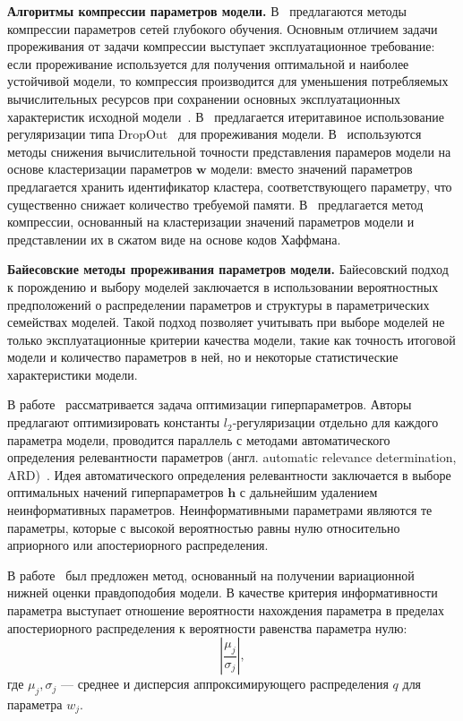 \textbf{Алгоритмы компрессии параметров модели.}
В~\cite{weight_quantization, weight_quantization2,nvidia_prune} предлагаются методы компрессии параметров сетей глубокого обучения. Основным отличием задачи прореживания от задачи компрессии выступает эксплуатационное требование: если прореживание используется для получения оптимальной и наиболее устойчивой модели, то компрессия производится для уменьшения потребляемых вычислительных ресурсов при сохранении основных эксплуатационных характеристик исходной модели~\cite{weight_quantization2}.
В~\cite{nvidia_prune}
предлагается итеритавиное использование регуляризации типа DropOut~\cite{dropout} для прореживания модели. 
В~\cite{weight_quantization, weight_quantization2} используются методы снижения вычислительной точности представления парамеров модели на основе кластеризации параметров $\mathbf{w}$ модели: вместо значений параметров предлагается хранить идентификатор кластера, соответствующего параметру, что существенно снижает количество требуемой памяти.
В~\cite{weight_quantization2} предлагается метод компрессии, основанный на кластеризации значений параметров модели и представлении их в сжатом виде на основе кодов Хаффмана.

\textbf{Байесовские методы прореживания параметров модели. }
Байесовский подход к порождению и выбору моделей заключается в использовании вероятностных предположений о распределении параметров и структуры в параметрических семействах моделей. Такой подход позволяет учитывать при выборе моделей не только эксплуатационные критерии качества модели, такие как точность итоговой модели и количество параметров в ней, но и некоторые статистические характеристики модели. 

В работе~\cite{hyper} рассматривается задача оптимизации гиперпараметров.  Авторы предлагают оптимизировать константы $l_2$-регуляризации отдельно для каждого параметра модели, проводится параллель с методами автоматического определения релевантности параметров (англ. automatic relevance determination, ARD)~\cite{MacKay}. 
Идея автоматического определения релевантности заключается в выборе оптимальных начений гиперпараметров $\mathbf{h}$ с дальнейшим удалением неинформативных параметров. Неинформативными параметрами являются те параметры, которые с высокой вероятностью равны нулю относительно априорного или апостериорного распределения.

В работе~\cite{nips} был предложен метод, основанный на получении вариационной нижней оценки правдоподобия модели. В качестве критерия информативности параметра выступает отношение вероятности нахождения параметра в пределах апостериорного распределения к вероятности равенства параметра нулю:
\[
    \left|\frac{\mu_j}{\sigma_j}\right|,  
\]
где $\mu_j, \sigma_j$ --- среднее и дисперсия аппроксимирующего распределения $q$ для параметра $w_j$.

